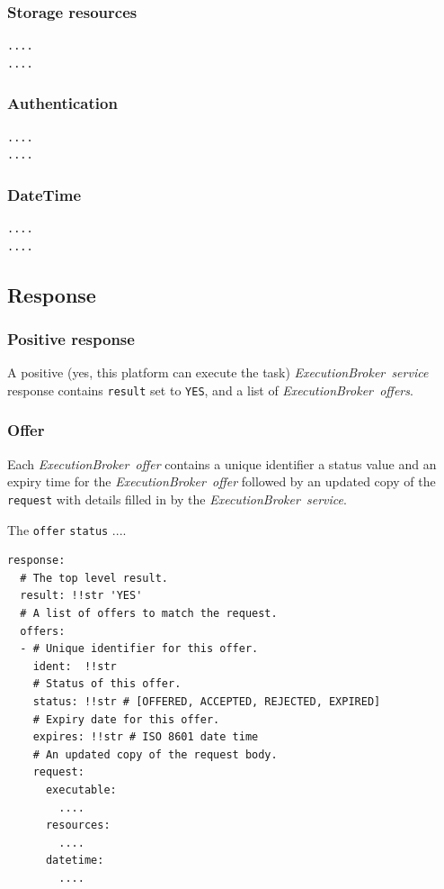 \documentclass[11pt,a4paper]{ivoa}
\newcommand{\execbrokerservice}[1] {\textit{ExecutionBroker~service#1}}
\newcommand{\execoffer}[1] {\textit{ExecutionBroker~offer#1}}
\newcommand{\codeword}[1] {\texttt{#1}}
\begin{document}
\subsubsection{Storage resources}
\label{subsub-datamodel-storage-resources}

\begin{lstlisting}[]
....
....
\end{lstlisting}

\subsubsection{Authentication}
\label{subsub-datamodel-authentication}

\begin{lstlisting}[]
....
....
\end{lstlisting}

\subsubsection{DateTime}
\label{subsub-datamodel-datetime}

\begin{lstlisting}[]
....
....
\end{lstlisting}

\subsection{Response}
\label{sub-datamodel-response}

\subsubsection{Positive response}
\label{subsub-datamodel-positive-response}
A positive (yes, this platform can execute the task) \execbrokerservice{} response contains \codeword{result}
set to \codeword{YES}, and a list of \execoffer{s}.

\subsubsection{Offer}
\label{subsub-datamodel-offer}

Each \execoffer{} contains a unique identifier a status value and an expiry time for the \execoffer{}
followed by an updated copy of the \codeword{request} with details
filled in by the \execbrokerservice{}.

The \codeword{offer} \codeword{status} ....

\begin{lstlisting}[]
response:
  # The top level result.
  result: !!str 'YES'
  # A list of offers to match the request.
  offers:
  - # Unique identifier for this offer.
    ident:  !!str
    # Status of this offer.
    status: !!str # [OFFERED, ACCEPTED, REJECTED, EXPIRED]
    # Expiry date for this offer.
    expires: !!str # ISO 8601 date time
    # An updated copy of the request body.
    request:
      executable:
        ....
      resources:
        ....
      datetime:
        ....
\end{lstlisting}
\end{document}
